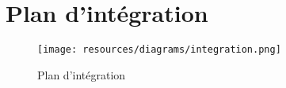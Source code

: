 \chapter{Plan d'intégration}

\begin{landscape}
\begin{figure}
  \centering
  \texttt{[image: resources/diagrams/integration.png]}
  \caption{Plan d'intégration}
\end{figure}
\end{landscape}

